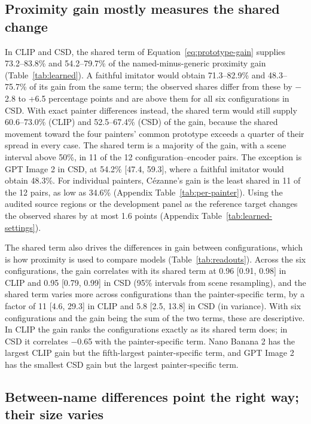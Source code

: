 \documentclass[10pt]{article}
\begin{document}
\subsection{Proximity gain mostly measures the shared change}\label{sec:learned}




In CLIP and CSD, the shared term of Equation~\ref{eq:prototype-gain} supplies 73.2--83.8\% and
54.2--79.7\% of the named-minus-generic proximity gain (Table~\ref{tab:learned}). A faithful
imitator would obtain 71.3--82.9\% and 48.3--75.7\% of its gain from the same term; the observed
shares differ from these by $-$2.8 to +6.5 percentage points and are above them for all six
configurations in CSD. With exact painter differences instead, the shared term would still supply
60.6--73.0\% (CLIP) and 52.5--67.4\% (CSD) of the gain, because the shared movement toward the four
painters' common prototype exceeds a quarter of their spread in every case. The shared term is a
majority of the gain, with a scene interval above 50\%, in 11 of the 12 configuration--encoder pairs.
The exception is GPT Image 2 in CSD, at 54.2\% [47.4, 59.3], where a faithful imitator would obtain
48.3\%. For individual painters, C\'ezanne's gain is the least shared in 11 of the 12 pairs, as low
as 34.6\% (Appendix Table~\ref{tab:per-painter}). Using the audited source regions or the
development panel as the reference target changes the observed shares by at most 1.6 points
(Appendix Table~\ref{tab:learned-settings}).

The shared term also drives the differences in gain between configurations, which is how proximity
is used to compare models (Table~\ref{tab:readouts}). Across the six configurations, the gain
correlates with its shared term at 0.96 [0.91, 0.98] in CLIP and 0.95 [0.79, 0.99] in CSD (95\%
intervals from scene resampling), and the shared term varies more across configurations than the
painter-specific term, by a factor of 11 [4.6, 29.3] in CLIP and 5.8 [2.5, 13.8] in CSD (in
variance). With six configurations and the gain being the sum of the two terms, these are
descriptive. In CLIP the gain ranks the configurations exactly as its shared term does; in CSD it
correlates $-$0.65 with the painter-specific term. Nano Banana 2 has the largest CLIP gain but the
fifth-largest painter-specific term, and GPT Image 2 has the smallest CSD gain but the largest
painter-specific term.

\subsection{Between-name differences point the right way; their size varies}\label{sec:agreement}
\end{document}
